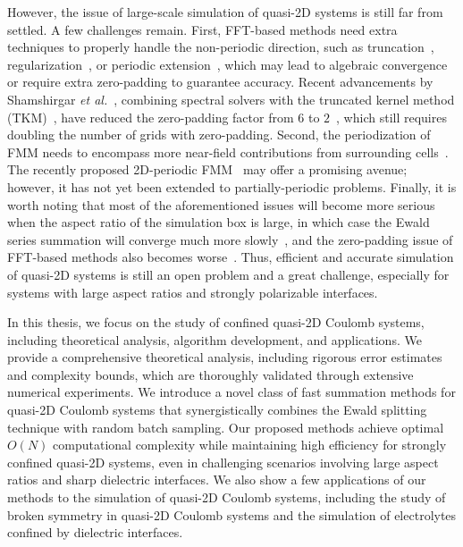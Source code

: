 However, the issue of large-scale simulation of quasi-2D systems is still far from settled.
A few challenges remain. First, FFT-based methods need extra techniques to properly handle the non-periodic direction, such as truncation~\cite{parry1975electrostatic}, regularization~\cite{nestler2015fast}, or periodic extension~\cite{lindbo2012fast}, which may lead to algebraic convergence or require extra zero-padding to guarantee accuracy. 
Recent advancements by Shamshirgar \emph{et al.}~\cite{shamshirgar2021fast}, combining spectral solvers with the truncated kernel method (TKM)~\cite{vico2016fast}, have reduced the zero-padding factor from $6$ to $2$~\cite{lindbo2012fast}, which still requires doubling the number of grids with zero-padding. 
Second, the periodization of FMM needs to encompass more near-field contributions from surrounding cells~\cite{yan2018flexibly,barnett2018unified}. The recently proposed 2D-periodic FMM~\cite{pei2023fast} may offer a promising avenue; however, it has not yet been extended to partially-periodic problems.
Finally, it is worth noting that most of the aforementioned issues will become more serious when the aspect ratio of the simulation box is large, in which case the Ewald series summation will converge much more slowly~\cite{arnold2002electrostatics}, and the zero-padding issue of FFT-based methods also becomes worse~\cite{maxian2021fast}.
Thus, efficient and accurate simulation of quasi-2D systems is still an open problem and a great challenge, especially for systems with large aspect ratios and strongly polarizable interfaces.


In this thesis, we focus on the study of confined quasi-2D Coulomb systems, including theoretical analysis, algorithm development, and applications.
We provide a comprehensive theoretical analysis, including rigorous error estimates and complexity bounds, which are thoroughly validated through extensive numerical experiments.
We introduce a novel class of fast summation methods for quasi-2D Coulomb systems that synergistically combines the Ewald splitting technique with random batch sampling. 
Our proposed methods achieve optimal $O(N)$ computational complexity while maintaining high efficiency for strongly confined quasi-2D systems, even in challenging scenarios involving large aspect ratios and sharp dielectric interfaces. 
We also show a few applications of our methods to the simulation of quasi-2D Coulomb systems, including the study of broken symmetry in quasi-2D Coulomb systems and the simulation of electrolytes confined by dielectric interfaces.

